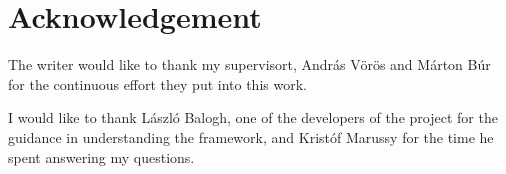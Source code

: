 \section{Acknowledgement}

The writer would like to thank my supervisort, {András Vörös} and {Márton Búr} for the continuous effort they put into this work.

I would like to thank {László Balogh}, one of the developers of the \viatrac{} project for the guidance in understanding the framework, and {Kristóf Marussy} for the time he spent answering my questions.
